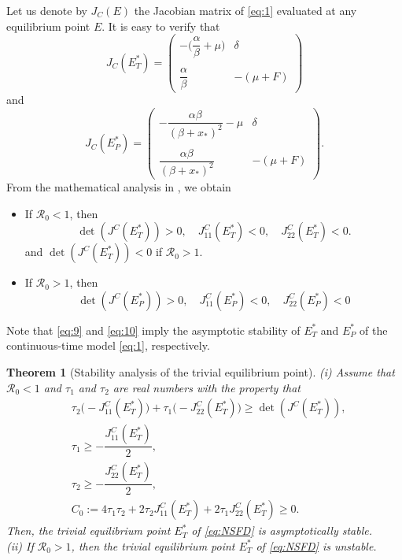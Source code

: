 \documentclass[12pt]{article}
\newtheorem{theorem}{Theorem}[section]
\theoremstyle{definition}
\theoremstyle{remark}
\numberwithin{equation}{section}
\begin{document}
Let us denote by $J_C(E)$ the Jacobian matrix of \eqref{eq:1} evaluated at any equilibrium point $E$. It is easy to verify that
\begin{equation}\label{eq:9a}
J_C(E_T^*) =
\begin{pmatrix}
-\bigg(\dfrac{\alpha}{\beta} + \mu\bigg)&\delta\\
&\\
\dfrac{\alpha}{\beta}&-(\mu + F)
\end{pmatrix}
\end{equation}
and
\begin{equation}\label{eq:10a}
J_C(E_P^*) =
\begin{pmatrix}
-\dfrac{\alpha\beta}{(\beta + x_*)^2} - \mu&\delta\\
&\\
\dfrac{\alpha\beta}{(\beta + x_*)^2}& -(\mu + F)
\end{pmatrix}.
\end{equation}
From the mathematical analysis in \cite{Ladino}, we obtain
\begin{itemize}
\item If $\mathcal{R}_0 < 1$, then
\begin{equation}\label{eq:9}
\det(J^C(E_T^*)) > 0, \quad J_{11}^C(E_T^*) < 0, \quad J_{22}^C(E_T^*) < 0.
\end{equation}
and $\det(J^C(E_T^*)) < 0$ if $\mathcal{R}_0 > 1$.
\item If $\mathcal{R}_0 > 1$, then
\begin{equation}\label{eq:10}
\det(J^C(E_P^*)) > 0, \quad J_{11}^C(E_P^*) < 0, \quad J_{22}^C(E_P^*) < 0
\end{equation}
\end{itemize}
Note that \eqref{eq:9} and \eqref{eq:10} imply the asymptotic stability of $E_T^*$ and $E_P^*$ of the continuous-time model \eqref{eq:1}, respectively.
\begin{theorem}[Stability analysis of the trivial equilibrium point]\label{Theorem2}
(i) Assume that $\mathcal{R}_0 < 1$ and $\tau_1$ and $\tau_2$ are real numbers with the property that
\begin{equation}\label{eq:DC1}
\begin{split}
&\tau_2\big(-J_{11}^C(E_T^*)\big) + \tau_1\big(-J_{22}^C(E_T^*)\big) \geq \det(J^C(E_T^*)),\\
&\tau_1 \geq -\dfrac{J_{11}^C(E_T^*)}{2},\\
&\tau_2 \geq -\dfrac{J_{22}^C(E_T^*)}{2},\\
&C_0:= 4\tau_1\tau_2 + 2\tau_2J_{11}^C(E_T^*) + 2\tau_1J_{22}^C(E_T^*) \geq 0.
\end{split}
\end{equation}
Then, the trivial equilibrium point $E_T^*$ of \eqref{eq:NSFD} is asymptotically stable.\\
(ii) If $\mathcal{R}_0 > 1$, then the trivial equilibrium point $E_T^*$ of \eqref{eq:NSFD} is unstable.


\end{theorem}
\end{document}
